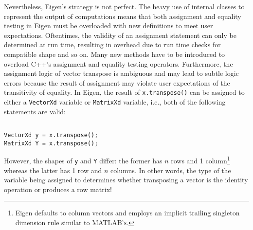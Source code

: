 Nevertheless, Eigen's strategy is not perfect. The heavy use of internal
classes to represent the output of computations means that both assignment
and equality testing in Eigen must be overloaded with new definitions
to meet user expectations. Oftentimes, the validity of an assignment
statement can only be determined at run time, resulting in overhead
due to run time checks for compatible shape and so on. Many new methods
have to be introduced to overload C++'s assignment and equality testing
operators. Furthermore, the assignment logic of vector transpose is
ambiguous and may lead to subtle logic errors because the result of
assignment may violate user expectations of the transitivity of equality.
In Eigen, the result of \verb`x.transpose()` can be assigned to either
a \verb`VectorXd` variable or \verb`MatrixXd` variable, i.e., both
of the following statements are valid:
\begin{verbatim}

VectorXd y = x.transpose();
MatrixXd Y = x.transpose();

\end{verbatim}
However, the shapes of \verb`y` and \verb`Y` differ: the former
has $n$ rows and 1 column\footnote{Eigen defaults to column vectors and employs an implicit trailing
singleton dimension rule similar to \textsc{{MATLAB}'s.}} whereas the latter has 1 row and $n$ columns. In other words, the
type of the variable being assigned to determines whether transposing
a vector is the identity operation or produces a row matrix!


